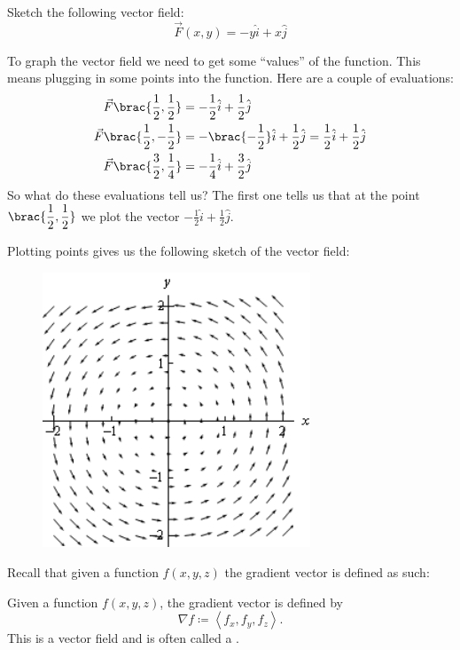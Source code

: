 \begin{exercise}
Sketch the following vector field:
\[ \vec{F}(x,y) = -y\hat{i} + x\hat{j} \]
\end{exercise}
\begin{solution}
To graph the vector field we need to get some ``values'' of the function. This means plugging in some points into the function. Here are a couple of evaluations:
\begin{align*}
\vec{F}\brac{{\frac{1}{2},\frac{1}{2}}} &=  -\frac{1}{2}\hat{i} + \frac{1}{2}\hat{j} \\
\vec{F}\brac{{\frac{1}{2},-\frac{1}{2}}} &=  -\brac{{-\frac{1}{2}}}\hat{i} + \frac{1}{2}\hat{j} = \frac{1}{2}\hat{i} + \frac{1}{2}\hat{j} \\
\vec{F}\brac{{\frac{3}{2},\frac{1}{4}}} &=  -\frac{1}{4}\hat{i} + \frac{3}{2}\hat{j}
\end{align*}
So what do these evaluations tell us? The first one tells us that at the point $\brac{\dfrac{1}{2},\dfrac{1}{2}}$ we plot the vector $-\frac{1}{2}\hat{i} + \frac{1}{2}\hat{j}$.

Plotting points gives us the following sketch of the vector field:

\begin{figure}[H]
    \centering
    \includegraphics[width=8cm]{images/vec_field2.png}
\end{figure}
\end{solution}

Recall that given a function $f(x,y,z)$ the gradient vector is defined as such:
\begin{definition}
Given a function $f(x,y,z)$, the gradient vector is defined by
\[ \nabla f\coloneqq\left\langle {{f_x},{f_y},{f_z}} \right\rangle. \]
This is a vector field and is often called a .
\end{definition}

